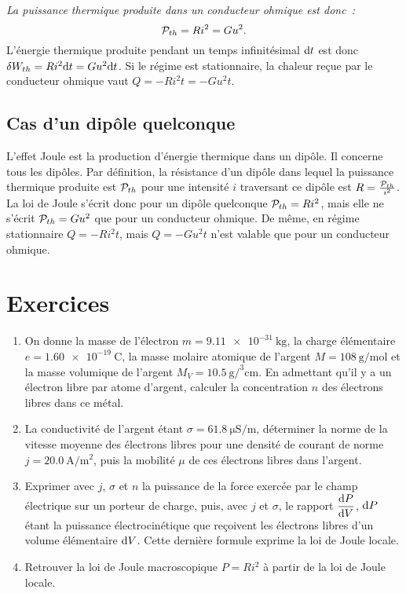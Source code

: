 \emph{La puissance thermique produite dans un conducteur ohmique est donc~:}%
\begin{equation}\label{eq:loidejoule}%
\P_{th} = Ri^2=Gu^2.
\end{equation}%
L'énergie thermique produite pendant un temps infinitésimal \(\D t\) est donc 
\(\delta W_{th} = Ri^2 \D t = Gu^2 \D t\). Si le régime est stationnaire, la 
chaleur reçue par le conducteur ohmique vaut \(Q = -Ri^2 t = -Gu^2 t\).

\subsection{Cas d'un dipôle quelconque}%

L'effet Joule est la production d'énergie thermique dans un dipôle. Il concerne 
tous les dipôles. Par définition, la résistance d'un dipôle dans lequel la 
puissance thermique produite est \(\P_{th}\) pour une intensité \(i\) 
traversant ce dipôle est \(R = \frac{\P_{th}}{i^2}\). La loi de Joule s'écrit 
donc pour un dipôle quelconque \(\P_{th} = Ri^2\), mais elle ne s'écrit 
\(\P_{th} = Gu^2\) que pour un conducteur ohmique. De même, en régime 
stationnaire \(Q = -Ri^2 t\), mais \(Q=-Gu^2t\) n'est valable que pour un 
conducteur ohmique.

\section{Exercices}%
\begin{exercice}%
  \begin{enumerate}
    \item On donne la masse de l'électron \(m=\SI{9.11e-31}{\kilogram}\), la 
      charge élémentaire \(e = \SI{1.60e-19}{\coulomb}\), la masse molaire 
      atomique de l'argent \(M=\SI{108}{\gram\per\mole}\) et la masse volumique 
      de l'argent \(M_V = \SI{10.5}{\gram\per\cubed\centi\meter}\). En 
      admettant qu'il y a un électron libre par atome d'argent, calculer la 
      concentration \(n\) des électrons libres dans ce métal.
    \item La conductivité de l'argent étant \(\sigma = 
      \SI{61.8}{\micro\siemens\per\meter}\), déterminer la norme de la vitesse 
      moyenne des électrons libres pour une densité de courant de norme 
      \(j=\SI{20.0}{\ampere\per\meter\squared}\), puis la mobilité \(\mu\) de 
      ces électrons libres dans l'argent.
    \item Exprimer avec \(j\), \(\sigma\) et \(n\) la puissance de la force 
      exercée par le champ électrique sur un porteur de charge, puis, avec 
      \(j\) et \(\sigma\), le rapport \(\derived{P}{V}\), \(\D P\) étant la 
      puissance électrocinétique que reçoivent les électrons libres d'un volume 
      élémentaire \(\D V\). Cette dernière formule exprime la loi de Joule 
      locale.
    \item Retrouver la loi de Joule macroscopique \(P=Ri^2\) à partir de la loi 
      de Joule locale.
  \end{enumerate}
\end{exercice}%

